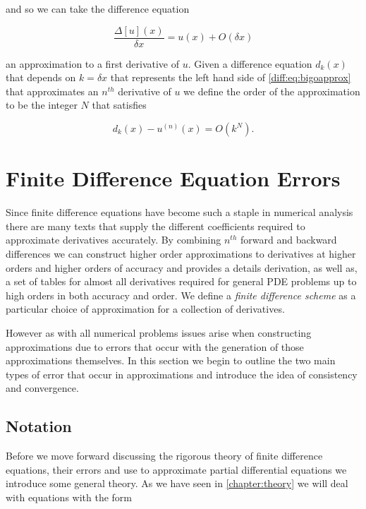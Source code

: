 \documentclass[../main.tex]{subfiles}
\begin{document}
  and so we can take the difference equation

  \begin{equation} \label{diff:eq:bigoapprox}
    \frac{\Delta[u](x)}{\delta x} = u(x) + O(\delta x)
  \end{equation}

  an approximation to a first derivative of $u$. Given a difference equation $d_k(x)$ that depends on $k = \delta x$ that represents the left hand side of \autoref{diff:eq:bigoapprox} that approximates an $n^{th}$ derivative of $u$ we define the order of the approximation to be the integer $N$ that satisfies

  \begin{equation}
    d_k(x) - u^{(n)}(x) = O(k^N).
  \end{equation}

  \section{Finite Difference Equation Errors}
  Since finite difference equations have become such a staple in numerical analysis there are many texts that supply the different coefficients required to approximate derivatives accurately. By combining $n^{th}$ forward and backward differences we can construct higher order approximations to derivatives at higher orders and higher orders of accuracy and \cite{fornberg1988} provides a details derivation, as well as, a set of tables for almost all derivatives required for general PDE problems up to high orders in both accuracy and order. We define a \emph{finite difference scheme} as a particular choice of approximation for a collection of derivatives.

  However as with all numerical problems issues arise when constructing approximations due to errors that occur with the generation of those approximations themselves. In this section we begin to outline the two main types of error that occur in approximations and introduce the idea of consistency and convergence.

  \subsection{Notation}
  Before we move forward discussing the rigorous theory of finite difference equations, their errors and use to approximate partial differential equations we introduce some general theory. As we have seen in \autoref{chapter:theory} we will deal with equations with the form
\end{document}
